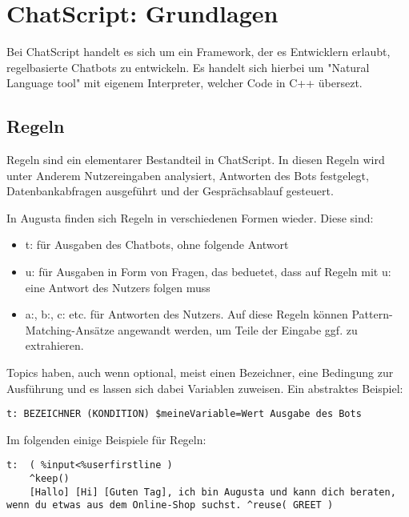 \chapter{ChatScript: Grundlagen}
\label{sec:ChatScript: Grundlagen}

Bei ChatScript handelt es sich um ein Framework, der es Entwicklern erlaubt, regelbasierte Chatbots zu entwickeln. Es handelt sich hierbei um "Natural Language tool" mit eigenem Interpreter, welcher Code in C++ übersezt. 


\section{Regeln}
\label{sec:ChatScript: Regeln}

Regeln sind ein elementarer Bestandteil in ChatScript. In diesen Regeln wird unter Anderem Nutzereingaben analysiert, Antworten des Bots festgelegt, Datenbankabfragen ausgeführt und der Gesprächsablauf gesteuert.  

In Augusta finden sich Regeln in verschiedenen Formen wieder. Diese sind: 

\begin{itemize}
\item t: für Ausgaben des Chatbots, ohne folgende Antwort 
\item u: für Ausgaben in Form von Fragen, das beduetet, dass auf Regeln mit u: eine Antwort des Nutzers folgen muss 
\item a:, b:, c: etc. für Antworten des Nutzers. Auf diese Regeln können Pattern-Matching-Ansätze angewandt werden, um Teile der Eingabe ggf. zu extrahieren.
\end{itemize}

Topics haben, auch wenn optional, meist einen Bezeichner, eine Bedingung zur Ausführung und es lassen sich dabei Variablen zuweisen. Ein abstraktes Beispiel:

\begin{lstlisting}[caption={Syntax für Regeln}]
t: BEZEICHNER (KONDITION) $meineVariable=Wert Ausgabe des Bots
\end{lstlisting}

Im folgenden einige Beispiele für Regeln:

\begin{lstlisting}[caption={Beispiel für t:}]
t:  ( %input<%userfirstline )
    ^keep()
    [Hallo] [Hi] [Guten Tag], ich bin Augusta und kann dich beraten, wenn du etwas aus dem Online-Shop suchst. ^reuse( GREET )
\end{lstlisting}

